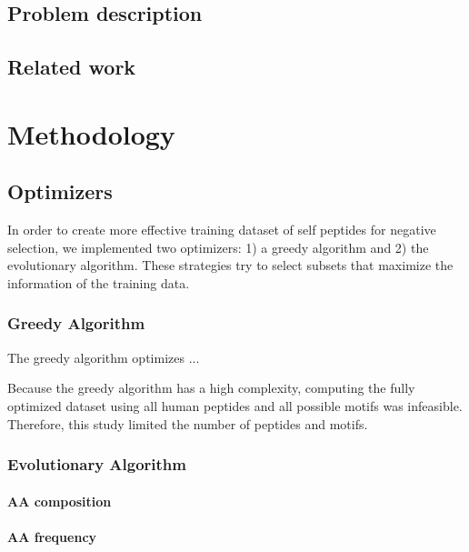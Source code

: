 \documentclass{article}
\begin{document}
\subsection{Problem description}

\subsection{Related work}


\cite{wortel2020t}


\section{Methodology}

\subsection{Optimizers} \label{optimizers}

In order to create more effective training dataset of self peptides for negative selection, we implemented two optimizers: 
1) a greedy algorithm and 2) the evolutionary algorithm. These strategies try to select subsets that maximize the information of the training data.



\subsubsection{Greedy Algorithm}

The greedy algorithm optimizes ...

Because the greedy algorithm has a high complexity, computing the fully optimized dataset using all human peptides and
all possible motifs was infeasible. Therefore, this study limited the number of peptides and motifs.


\subsubsection{Evolutionary Algorithm} 

\paragraph{AA composition}



\paragraph{AA frequency}
\end{document}
